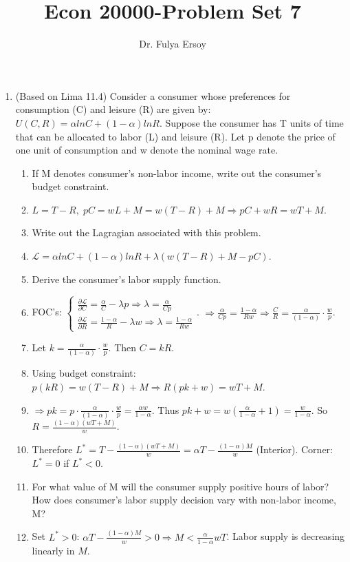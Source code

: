 \documentclass{article}
\title{Econ 20000-Problem Set 7}
\author{Dr. Fulya Ersoy}
\date{}
\begin{document}
\maketitle
\begin{enumerate}
\item (Based on Lima 11.4) Consider a consumer whose preferences for consumption (C) and leisure (R) are given by: $U(C,R) = \alpha lnC +(1-\alpha) lnR$. Suppose the consumer has T units of time that can be allocated to labor (L) and leisure (R). Let p denote the price of one unit of consumption and w denote the nominal wage
rate.
 \begin{enumerate}[label=(\alph*)]
\item  If M denotes consumer's non-labor income, write out the consumer’s budget constraint.
\item[] $L=T-R, \; pC=wL+M=w(T-R)+M\Rightarrow pC+wR=wT+M$.
\item Write out the Lagragian associated with this problem.
\item[] $\mathcal{L}=\alpha lnC+(1-\alpha)lnR+\lambda(w(T-R)+M-pC)$.
\item Derive the consumer’s labor supply function.
\item[] FOC's: $\begin{cases}
    \frac{\partial\mathcal{L}}{\partial C}=\frac{\alpha}{C}-\lambda p\Rightarrow\lambda=\frac{\alpha}{Cp}\\ \frac{\partial\mathcal{L}}{\partial R}=\frac{1-\alpha}{R}-\lambda w\Rightarrow\lambda=\frac{1-\alpha}{Rw}
\end{cases}$. $\Rightarrow \frac{\alpha}{Cp}=\frac{1-\alpha}{Rw}\Rightarrow\frac{C}{R}=\frac{\alpha }{(1-\alpha)}\cdot\frac{w}{p}$.
\item[] Let $k=\frac{\alpha }{(1-\alpha)}\cdot\frac{w}{p}$. Then $C=kR$. 
\item[] Using budget constraint: $p(kR)=w(T-R)+M\Rightarrow R(pk+w)=wT+M$.
\item[] $\Rightarrow pk=p\cdot\frac{\alpha }{(1-\alpha)}\cdot\frac{w}{p}=\frac{\alpha w}{1-\alpha}$. Thus $pk+w=w(\frac{\alpha}{1-\alpha}+1)=\frac{w}{1-\alpha}$. So $R=\frac{(1-\alpha)(wT+M)}{w}$.
\item[] Therefore $L^*=T-\frac{(1-\alpha)(wT+M)}{w}=\alpha T-\frac{(1-\alpha)M}{w}$ (Interior). Corner: $L^*=0$ if $L^*<0$.
\item For what value of M will the consumer supply positive hours of labor? How does consumer's labor supply decision vary with non-labor income, M?
\item[] Set $L^*>0$: $\alpha T-\frac{(1-\alpha)M}{w}>0\Rightarrow M<\frac{\alpha}{1-\alpha}wT$. Labor supply is decreasing linearly in $M$.

\end{enumerate}
\end{enumerate}
\end{document}
